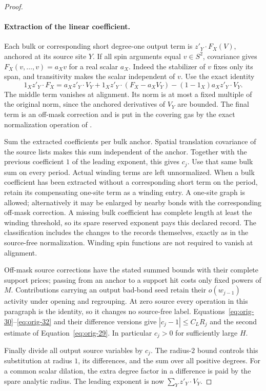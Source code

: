 \begin{proof}
\paragraph{Extraction of the linear coefficient.}
Each bulk or corresponding short degree-one output term is
$z'_Y\cdot F_X(V)$, anchored at its source site $Y$.  If all spin
arguments equal $v\in S^2$, covariance gives
$F_X(v,\ldots,v)=a_Xv$ for a real scalar $a_X$.  Indeed the
stabilizer of $v$ fixes only its span, and transitivity makes the
scalar independent of $v$.  Use the exact identity
\[
 1_Xz'_Y\cdot F_X
 =a_Xz'_Y\cdot V_Y
  +1_Xz'_Y\cdot(F_X-a_XV_Y)
  -(1-1_X)a_Xz'_Y\cdot V_Y.
\]
The middle term vanishes at alignment.  Its norm is at most a
fixed multiple of the original norm, since the anchored
derivatives of $V_Y$ are bounded.  The final term is an off-mask
correction and is put in the covering gas by the exact
normalization operation of .

Sum the extracted coefficients per bulk anchor.  Spatial
translation covariance of the source lists makes this sum
independent of the anchor.  Together with
the previous coefficient $1$ of the leading exponent, this gives
$c_j$.  Use that same bulk sum on every period.  Actual winding
terms are left unnormalized.  When a bulk coefficient has been
extracted without a corresponding short term on the period,
retain its compensating one-site term as a winding entry.  A
one-site graph is allowed; alternatively it may be enlarged by
nearby bonds with the corresponding off-mask correction.  A
missing bulk coefficient has complete length at least the
winding threshold, so its spare reserved exponent pays this
declared record.  The classification includes the changes to
the records themselves, exactly as in the source-free
normalization.  Winding spin functions are not required to
vanish at alignment.

Off-mask source corrections have the stated summed bounds with
their complete support prices; passing from an anchor to a
support hit costs only fixed powers of $M$.  Contributions
carrying an output bad-bond seed retain their $o(w_{j-1})$
activity under opening and regrouping.  At zero source every
operation in this paragraph is the identity, so it changes no
source-free label.  Equations~\eqref{eq:orig-30}--\eqref{eq:orig-32}
and their difference versions give $|c_j-1|\le C_LR_j$ and the
second estimate of Equation~\eqref{eq:orig-29}.  In particular
$c_j>0$ for sufficiently large $H$.

Finally divide all output source variables by $c_j$.  The radius-$2$
bound controls this substitution at radius $1$, its differences,
and the sum over all positive degrees.  For a common scalar
dilation, the extra degree factor in a difference is paid by the
spare analytic radius.  The leading exponent is now
$\sum_Yz'_Y\cdot V_Y$.


\end{proof}
